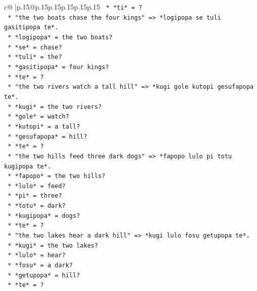 \documentclass{article}
\begin{document}
{\begin{supertabular}{c@{$\;$}|p{.15\linewidth}@{}p{.15\linewidth}p{.15\linewidth}p{.15\linewidth}p{.15\linewidth}p{.15\linewidth}}
{{{\texttt{                    *   *ti* = ?} \\
\texttt{                *   "the two boats chase the four kings" => *logipopa se tuli gasitipopa te*.} \\
\texttt{                    *   *logipopa* = the two boats?} \\
\texttt{                    *   *se* = chase?} \\
\texttt{                    *   *tuli* = the?} \\
\texttt{                    *   *gasitipopa* = four kings?} \\
\texttt{                    *   *te* = ?} \\
\texttt{                *   "the two rivers watch a tall hill" => *kugi gole kutopi gesufapopa te*.} \\
\texttt{                    *   *kugi* = the two rivers?} \\
\texttt{                    *   *gole* = watch?} \\
\texttt{                    *   *kutopi* = a tall?} \\
\texttt{                    *   *gesufapopa* = hill?} \\
\texttt{                    *   *te* = ?} \\
\texttt{                *   "the two hills feed three dark dogs" => *fapopo lulo pi totu kugipopa te*.} \\
\texttt{                    *   *fapopo* = the two hills?} \\
\texttt{                    *   *lulo* = feed?} \\
\texttt{                    *   *pi* = three?} \\
\texttt{                    *   *totu* = dark?} \\
\texttt{                    *   *kugipopa* = dogs?} \\
\texttt{                    *   *te* = ?} \\
\texttt{                *   "the two lakes hear a dark hill" => *kugi lulo fosu getupopa te*.} \\
\texttt{                    *   *kugi* = the two lakes?} \\
\texttt{                    *   *lulo* = hear?} \\
\texttt{                    *   *fosu* = a dark?} \\
\texttt{                    *   *getupopa* = hill?} \\
\texttt{                    *   *te* = ?} \\
}}}
\end{supertabular}}
\end{document}
